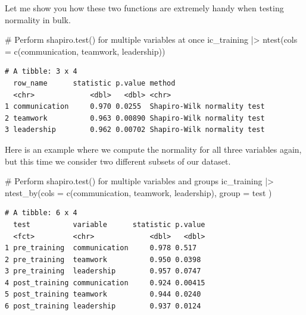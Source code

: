 \documentclass[
  letterpaper,
  DIV=11,
  numbers=noendperiod]{scrreprt}
\newenvironment{Shaded}{\begin{snugshade}}{\end{snugshade}}
\newcommand{\AttributeTok}[1]{\textcolor[rgb]{0.40,0.45,0.13}{#1}}
\newcommand{\CommentTok}[1]{\textcolor[rgb]{0.37,0.37,0.37}{#1}}
\newcommand{\FunctionTok}[1]{\textcolor[rgb]{0.28,0.35,0.67}{#1}}
\newcommand{\NormalTok}[1]{\textcolor[rgb]{0.00,0.23,0.31}{#1}}
\newcommand{\SpecialCharTok}[1]{\textcolor[rgb]{0.37,0.37,0.37}{#1}}
\begin{document}
Let me show you how these two functions are extremely handy when testing
normality in bulk.

\begin{Shaded}
\begin{Highlighting}[]
\CommentTok{\# Perform \textquotesingle{}shapiro.test()\textquotesingle{} for multiple variables at once}
\NormalTok{ic\_training }\SpecialCharTok{|\textgreater{}} \FunctionTok{ntest}\NormalTok{(}\AttributeTok{cols =} \FunctionTok{c}\NormalTok{(communication,}
\NormalTok{                              teamwork,}
\NormalTok{                              leadership))}
\end{Highlighting}
\end{Shaded}

\begin{verbatim}
# A tibble: 3 x 4
  row_name      statistic p.value method                     
  <chr>             <dbl>   <dbl> <chr>                      
1 communication     0.970 0.0255  Shapiro-Wilk normality test
2 teamwork          0.963 0.00890 Shapiro-Wilk normality test
3 leadership        0.962 0.00702 Shapiro-Wilk normality test
\end{verbatim}

Here is an example where we compute the normality for all three
variables again, but this time we consider two different subsets of our
dataset.

\begin{Shaded}
\begin{Highlighting}[]
\CommentTok{\# Perform \textquotesingle{}shapiro.test()\textquotesingle{} for multiple variables and groups}
\NormalTok{ic\_training }\SpecialCharTok{|\textgreater{}} \FunctionTok{ntest\_by}\NormalTok{(}\AttributeTok{cols =} \FunctionTok{c}\NormalTok{(communication,}
\NormalTok{                                 teamwork,}
\NormalTok{                                 leadership),}
                        \AttributeTok{group =}\NormalTok{ test}
\NormalTok{                        )}
\end{Highlighting}
\end{Shaded}

\begin{verbatim}
# A tibble: 6 x 4
  test          variable      statistic p.value
  <fct>         <chr>             <dbl>   <dbl>
1 pre_training  communication     0.978 0.517  
2 pre_training  teamwork          0.950 0.0398 
3 pre_training  leadership        0.957 0.0747 
4 post_training communication     0.924 0.00415
5 post_training teamwork          0.944 0.0240 
6 post_training leadership        0.937 0.0124 
\end{verbatim}
\end{document}
